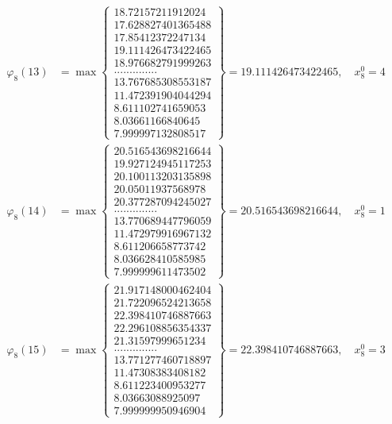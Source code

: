 \documentclass{article}
\begin{document}
\begin{align*}
  
  
  
\varphi_{8}(13) &= \max \left\{ \begin{array}{c}
18.72157211912024 \\
 17.628827401365488 \\
 17.85412372247134 \\
 19.111426473422465 \\
 18.976682791999263 \\
 .............. \\
 13.767685308553187 \\
 11.472391904044294 \\
 8.611102741659053 \\
 8.03661166840645 \\
 7.999997132808517
\end{array} \right\} = 19.111426473422465, \quad x_{8}^0 = 4\\
  
  
  
  
\varphi_{8}(14) &= \max \left\{ \begin{array}{c}
20.516543698216644 \\
 19.927124945117253 \\
 20.100113203135898 \\
 20.05011937568978 \\
 20.377287094245027 \\
 .............. \\
 13.770689447796059 \\
 11.472979916967132 \\
 8.611206658773742 \\
 8.036628410585985 \\
 7.999999611473502
\end{array} \right\} = 20.516543698216644, \quad x_{8}^0 = 1\\
  
  
  
  
\varphi_{8}(15) &= \max \left\{ \begin{array}{c}
21.917148000462404 \\
 21.722096524213658 \\
 22.398410746887663 \\
 22.296108856354337 \\
 21.31597999651234 \\
 .............. \\
 13.771277460718897 \\
 11.47308383408182 \\
 8.611223400953277 \\
 8.03663088925097 \\
 7.999999950946904
\end{array} \right\} = 22.398410746887663, \quad x_{8}^0 = 3\\
  

\end{align*}
\end{document}
